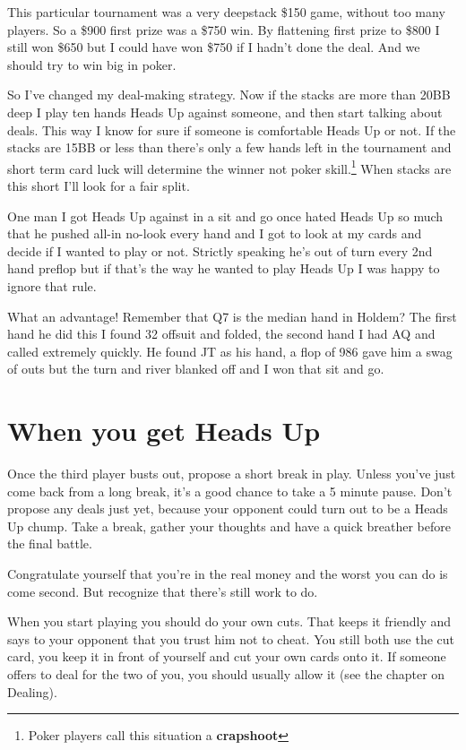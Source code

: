 This particular tournament was a very deepstack \$150
game, without too many players. So a \$900 first prize
was a \$750 win. By flattening first prize to \$800 I still won \$650 but
I could have won \$750 if I hadn't done the deal. And we should
try to win big in poker.

So I've changed my deal-making strategy. Now
if the stacks are more than 20BB deep
I play ten hands Heads Up against someone,
and then start talking about deals. This way I know for sure if someone
is comfortable Heads Up or not. If the stacks are 15BB or less than
there's only a few hands left in the tournament and short term
card luck will determine the winner not poker skill.\footnote{Poker
players call this situation a \textbf{crapshoot}} When stacks are
this short I'll look for a fair split.

One man I got Heads Up against in a sit and go once hated
Heads Up so much that he pushed all-in no-look every hand and
I got to look at my cards and decide if I wanted to play or not.
Strictly speaking he's out of turn every 2nd hand preflop but
if that's the way he wanted to play Heads Up I was happy to
ignore that rule.

What an advantage! Remember that Q7 is the median hand in Holdem?
The first hand he did this I found 32 offsuit
and folded, the second hand I had AQ and called extremely quickly.
He found JT as his hand, a flop of 986 gave him a swag of
outs but the turn and river blanked off and
I won that sit and go.

\section{When you get Heads Up}

Once the third player busts out, propose a short
break in play. Unless you've just come back from
a long break, it's a good chance to take a 5 minute
pause. Don't propose any deals just yet, because
your opponent could turn out to be a Heads Up chump.
Take a break, gather your thoughts and have a quick
breather before the final battle.

Congratulate yourself that you're in the real money
and the worst you can do is come second. But
recognize that there's still work to do.

When you start playing you should do your own
cuts. That keeps it friendly and says to your
opponent that you trust him not to cheat. You
still both use the cut card, you keep it in
front of yourself and cut your own cards onto it.
If someone offers to deal for the two of you, you
should usually allow it (see the chapter on
Dealing).

